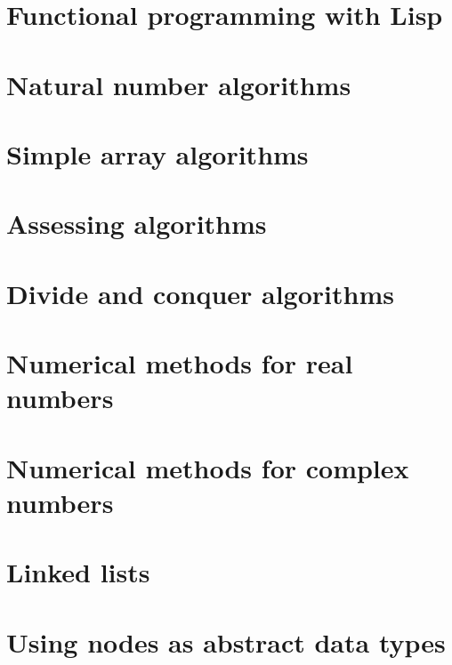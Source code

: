 \documentclass[oneside]{book}
\begin{document}
\part{Functional programming with Lisp}





\part{Natural number algorithms}





\part{Simple array algorithms}






\part{Assessing algorithms}



\part{Divide and conquer algorithms}


\part{Numerical methods for real numbers}







\part{Numerical methods for complex numbers}


\part{Linked lists}



\part{Using nodes as abstract data types}


\end{document}
